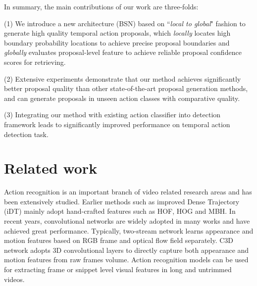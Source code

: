 \documentclass[runningheads]{llncs}
\begin{document}
In summary, the main contributions of our work are three-folds:


(1) We introduce a new architecture (BSN) based on ``\emph{local to global}" fashion to generate high quality temporal action proposals, which \emph{locally} locates high boundary probability locations to achieve precise proposal boundaries and \emph{globally} evaluates proposal-level feature to achieve reliable proposal confidence scores for retrieving.


(2) Extensive experiments demonstrate that our method achieves significantly better proposal quality than other state-of-the-art proposal generation methods, and can generate proposals in unseen action classes with comparative quality.

(3) Integrating our method with existing action classifier into detection framework leads to significantly improved performance on temporal action detection task.%

\vspace{-0.1cm}

\section{Related work}

Action recognition is an important branch of video related research areas and has been extensively studied. Earlier methods such as improved Dense Trajectory (iDT) \cite{dtf,wang2013action} mainly adopt hand-crafted features such as HOF, HOG and MBH. In recent years, convolutional networks are widely adopted in many works \cite{feichtenhofer2016convolutional,simonyan2014two,tran2015learning,wang2015towards} and have achieved great performance. Typically, two-stream network \cite{feichtenhofer2016convolutional,simonyan2014two,wang2015towards} learns appearance and motion features based on RGB frame and optical flow field separately. C3D network \cite{tran2015learning} adopts 3D convolutional layers to directly capture both appearance and motion features from raw frames volume.
Action recognition models can be used for extracting frame or snippet level visual features in long and untrimmed videos.
\end{document}
